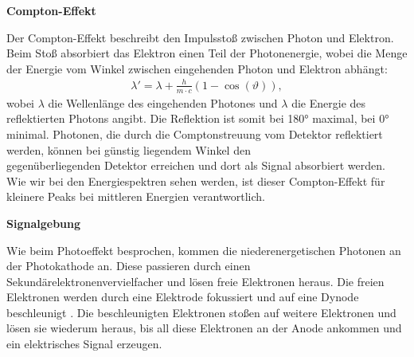 \documentclass[%
aps,
onecolumn,
11pt,
tightenlines,
nofootinbib,
superscriptaddress,
floatfix,
prd,
]{revtex4-2}
\begin{document}
\textbf{Compton-Effekt}\par
Der Compton-Effekt beschreibt den Impulsstoß zwischen Photon und Elektron. Beim Stoß absorbiert das Elektron einen Teil der Photonenergie, wobei die Menge der Energie vom Winkel zwischen eingehenden Photon und Elektron abhängt:
\begin{align*}
	\lambda ' = \lambda + \frac{h}{m\cdot c} \left( 1-\cos (\vartheta) \right),
\end{align*}
wobei $\lambda$ die Wellenlänge des eingehenden Photones und $\lambda$ die Energie des reflektierten Photons angibt. Die Reflektion ist somit bei 180° maximal, bei 0° minimal. Photonen, die durch die Comptonstreuung vom Detektor reflektiert werden, können bei günstig liegendem Winkel den \\ gegenüberliegenden Detektor erreichen und dort als Signal absorbiert werden. Wie wir bei den Energiespektren sehen werden, ist dieser Compton-Effekt für kleinere Peaks bei mittleren Energien verantwortlich.\vspace{15pt}\par
\textbf{Signalgebung}\par
Wie beim Photoeffekt besprochen, kommen die niederenergetischen Photonen an der Photokathode an. Diese passieren durch einen Sekundärelektronenvervielfacher und lösen freie Elektronen heraus. Die freien Elektronen werden durch eine Elektrode fokussiert und auf eine Dynode beschleunigt \cite{manual1}. Die beschleunigten Elektronen stoßen auf weitere Elektronen und lösen sie wiederum heraus, bis all diese Elektronen an der Anode ankommen und ein elektrisches Signal erzeugen. \cite{manual1}
\end{document}
